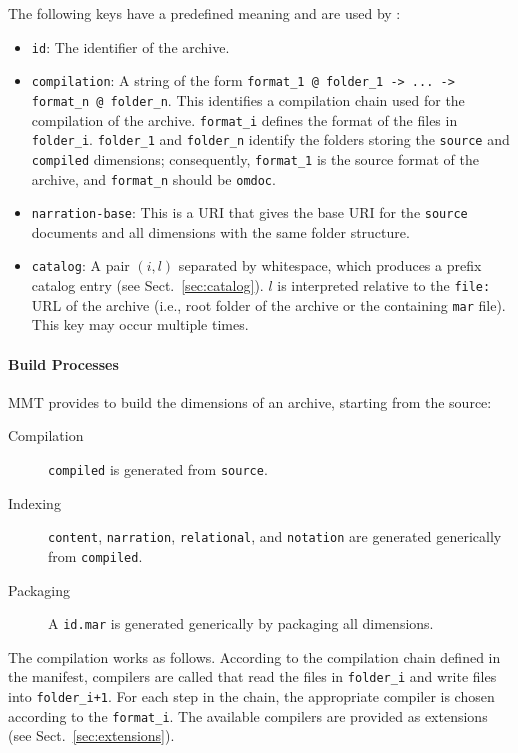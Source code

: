 The following keys have a predefined meaning and are used by {\mmt}:
\begin{itemize}
 \item \texttt{id}: The identifier of the archive.
 \item \texttt{compilation}: A string of the form \texttt{format\_1 @ folder\_1 -> ... -> format\_n @ folder\_n}. This identifies a compilation chain used for the compilation of the archive. \texttt{format\_i} defines the format of the files in \texttt{folder\_i}. \texttt{folder\_1} and \texttt{folder\_n} identify the folders storing the \texttt{source} and \texttt{compiled} dimensions; consequently, \texttt{format\_1} is the source format of the archive, and \texttt{format\_n} should be \texttt{omdoc}.
 \item \texttt{narration-base}: This is a URI that gives the base URI for the \texttt{source} documents and all dimensions with the same folder structure.
 \item \texttt{catalog}: A pair $(i,l)$ separated by whitespace, which produces a prefix catalog entry (see Sect.~\ref{sec:catalog}). $l$ is interpreted relative to the \texttt{file:} URL of the archive (i.e., root folder of the archive or the containing \texttt{mar} file). This key may occur multiple times.
\end{itemize}


\paragraph{Build Processes}
MMT provides to build the dimensions of an archive, starting from the source:
\begin{description}
 \item[Compilation] \texttt{compiled} is generated from \texttt{source}.
 \item[Indexing] \texttt{content}, \texttt{narration}, \texttt{relational}, and \texttt{notation} are generated generically from \texttt{compiled}.
 \item[Packaging] A \texttt{id.mar} is generated generically by packaging all dimensions.
\end{description}

The compilation works as follows. According to the compilation chain defined in the manifest, compilers are called that read the files in \texttt{folder\_i} and write files into \texttt{folder\_i+1}. For each step in the chain, the appropriate compiler is chosen according to the \texttt{format\_i}.
The available compilers are provided as extensions (see Sect.~\ref{sec:extensions}).


